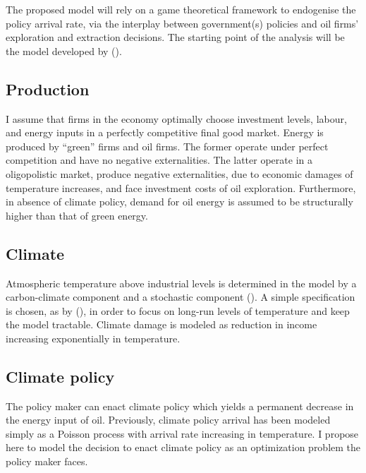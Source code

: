 \documentclass[american]{scrartcl}
\newcommand{\citein}[1]{\citeauthor{#1} (\citeyear{#1})}
\begin{document}
The proposed model will rely on a game theoretical framework to endogenise the policy arrival rate, via the interplay between government(s) policies and oil firms' exploration and extraction decisions. The starting point of the analysis will be the model developed by \citein{Barnett2019}.

\subsection{Production}

I assume that firms in the economy optimally choose investment levels, labour, and energy inputs in a perfectly competitive final good market. Energy is produced by ``green'' firms and oil firms. The former operate under perfect competition and have no negative externalities. The latter operate in a oligopolistic market, produce negative externalities, due to economic damages of temperature increases, and face investment costs of oil exploration. Furthermore, in absence of climate policy, demand for oil energy is assumed to be structurally higher than that of green energy.

\subsection{Climate}

Atmospheric temperature above industrial levels is determined in the model by a carbon-climate component and a stochastic component (\cite{MacDougall2015}). A simple specification is chosen, as by \citein{Barnett2019}, in order to focus on long-run levels of temperature and keep the model tractable. Climate damage is modeled as reduction in income increasing exponentially in temperature.

\subsection{Climate policy}

The policy maker can enact climate policy which yields a permanent decrease in the energy input of oil. Previously, climate policy arrival has been modeled simply as a Poisson process with arrival rate increasing in temperature. I propose here to model the decision to enact climate policy as an optimization problem the policy maker faces.
\end{document}
